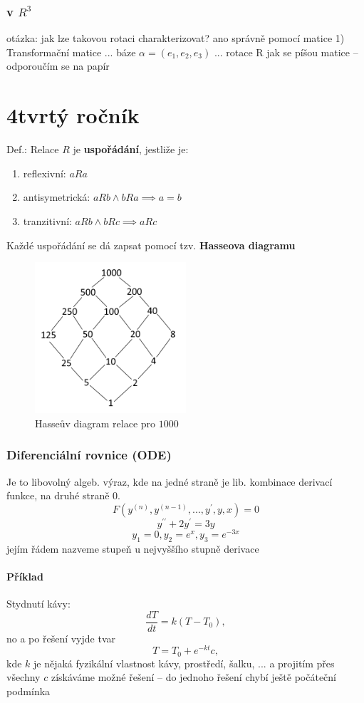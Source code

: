 \documentclass{article}
\begin{document}
\section{v $R^3$}
otázka: jak lze takovou rotaci charakterizovat? ano správně pomocí matice
1) Transformační matice
... báze $\alpha = (e_1, e_2, e_3)$
... rotace R
jak se píšou matice -- odporoučím se na papír

\part{4tvrtý ročník}

Def.: Relace $R$ je \textbf{uspořádání}, jestliže je:
\begin{enumerate}
  \item reflexivní: $aRa$
  \item antisymetrická: $aRb  \land bRa \implies a = b$
  \item tranzitivní: $aRb \land bRc \implies aRc$
\end{enumerate}

Každé uspořádání se dá zapsat pomocí tzv. \textbf{Hasseova diagramu}

\begin{figure}[h]
  \begin{center}
    \includegraphics[width=0.5\textwidth]{hasseuv.png}
    \caption{Hasseův diagram relace  pro $1000$}
  \end{center}
\end{figure}

\section{Diferenciální rovnice (ODE)}
Je to libovolný algeb. výraz, kde na jedné straně je lib. kombinace derivací funkce, na druhé straně 0.
$$F(y^{(n)}, y^{(n-1)}, ..., y^{\prime}, y, x)=0$$
$$y^{\prime \prime} + 2y^{\prime}=3y$$
$$y_1 = 0, y_2 = e^x, y_3 = e^{-3x}$$
jejím řádem nazveme stupeň u nejvyššího stupně derivace

\subsection{Příklad}
Stydnutí kávy:
$$\frac{dT}{dt} = k(T-T_0),$$
no a po řešení vyjde tvar
$$T = T_0 + e^{-kt}c,$$
kde $k$ je nějaká fyzikální vlastnost kávy, prostředí, šalku, ... a projitím přes všechny $c$ získáváme možné řešení -- do jednoho řešení chybí ještě počáteční podmínka
\end{document}
